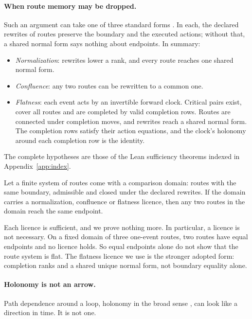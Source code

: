 \paragraph{When route memory may be dropped.}
Such an argument can take one of three standard forms
\citep{Newman1942, BaaderNipkow1998}. In each, the declared rewrites of routes
preserve the boundary and the executed actions; without that, a shared normal
form says nothing about endpoints. In summary:
\begin{itemize}
\item \emph{Normalization}: rewrites lower a rank, and every route reaches one
shared normal form.
\item \emph{Confluence}: any two routes can be rewritten to a common one.
\item \emph{Flatness}: each event acts by an invertible forward clock. Critical
pairs exist, cover all routes and are completed by valid completion rows.
Routes are connected under completion moves, and rewrites reach a shared normal
form. The completion rows satisfy their action equations, and the clock's
holonomy around each completion row is the identity.
\end{itemize}
The complete hypotheses are those of the Lean sufficiency theorems indexed in
Appendix~\ref{app:index}.

\begin{theorem}
\label{thm:licences}
Let a finite system of routes come with a comparison domain: routes with the
same boundary, admissible and closed under the declared rewrites. If the domain
carries a normalization, confluence or flatness licence, then any two routes in
the domain reach the same endpoint.
\end{theorem}

Each licence is sufficient, and we prove nothing more. In particular, a licence
is not necessary. On a fixed domain of three one-event routes, two routes have
equal endpoints and no licence holds. So equal endpoints alone do not show that
the route system is flat. The flatness licence we use is the stronger adopted
form: completion ranks and a shared unique normal form, not boundary equality
alone.

\paragraph{Holonomy is not an arrow.}
Path dependence around a loop, holonomy in the broad sense
\citep{Nakahara2003}, can look like a direction in time. It is not one.

